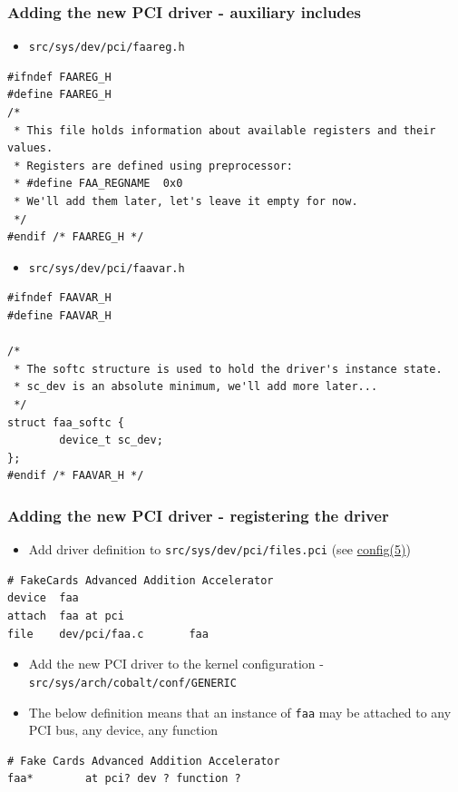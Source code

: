 \documentclass[dvipsnames,table]{beamer}
\begin{document}
\begin{frame}[fragile]
\frametitle{Adding the new PCI driver - auxiliary includes}
\scriptsize
\begin{itemize}
	\item {\tt src/sys/dev/pci/faareg.h}
\end{itemize}
\begin{lstlisting}
#ifndef FAAREG_H
#define FAAREG_H
/* 
 * This file holds information about available registers and their values.
 * Registers are defined using preprocessor:
 * #define FAA_REGNAME	0x0
 * We'll add them later, let's leave it empty for now.
 */
#endif /* FAAREG_H */
\end{lstlisting}
\begin{itemize}
	\item {\tt src/sys/dev/pci/faavar.h}
\end{itemize}
\begin{lstlisting}
#ifndef FAAVAR_H
#define FAAVAR_H

/* 
 * The softc structure is used to hold the driver's instance state.
 * sc_dev is an absolute minimum, we'll add more later...
 */
struct faa_softc {
        device_t sc_dev;
};
#endif /* FAAVAR_H */
\end{lstlisting}
\end{frame}

\begin{frame}[fragile]
\frametitle{Adding the new PCI driver - registering the driver}
\scriptsize
\begin{itemize}
	\item Add driver definition to {\tt src/sys/dev/pci/files.pci} (see \href{http://netbsd.gw.com/cgi-bin/man-cgi?config+5+NetBSD-current}{config(5)})
\end{itemize}
\begin{verbatim}
# FakeCards Advanced Addition Accelerator
device	faa
attach	faa at pci
file	dev/pci/faa.c		faa	
\end{verbatim}
\begin{itemize}
	\item Add the new PCI driver to the kernel configuration - {\tt src/sys/arch/cobalt/conf/GENERIC}
	\item The below definition means that an instance of {\tt faa} may be attached to any PCI bus, any device, any function
\end{itemize}
\begin{verbatim}
# Fake Cards Advanced Addition Accelerator
faa*		at pci? dev ? function ?
\end{verbatim}
\end{frame}
\end{document}
